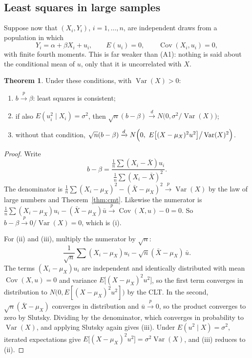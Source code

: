 \documentclass[11pt,a4paper]{article}
\numberwithin{equation}{section}
\DeclareMathOperator{\Var}{Var}
\DeclareMathOperator{\Cov}{Cov}
\theoremstyle{definition}
\newtheorem{thm}{Theorem}[subsection]
\begin{document}
\subsection{Least squares in large samples}
\label{ssec:olsasym}

Suppose now that $(X_i, Y_i)$, $i = 1, \dots, n$, are independent draws from a population in which
\[
Y_i = \alpha + \beta X_i + u_i, \qquad E(u_i) = 0, \qquad \Cov(X_i, u_i) = 0 ,
\]
with finite fourth moments. This is far weaker than (A1): nothing is said about the conditional mean of $u$, only that it is uncorrelated with $X$.

\begin{thm}
\label{thm:olsconsistent}
Under these conditions, with $\Var(X) > 0$:
\begin{enumerate}[label=(\roman*)]
\item $b \xrightarrow{p} \beta$: least squares is consistent;
\item if also $E(u_i^2 \mid X_i) = \sigma^2$, then $\sqrt n(b - \beta) \xrightarrow{d} N\bigl(0, \sigma^2/\Var(X)\bigr)$;
\item without that condition, $\sqrt n(b - \beta) \xrightarrow{d} N\Bigl(0,\ E\bigl[(X - \mu_X)^2u^2\bigr]\big/\Var(X)^2\Bigr)$.
\end{enumerate}
\end{thm}

\begin{proof}
Write
\[
b - \beta = \frac{\frac1n\sum (X_i - \bar X)u_i}{\frac1n\sum (X_i - \bar X)^2} .
\]
The denominator is $\frac1n\sum (X_i - \mu_X)^2 - (\bar X - \mu_X)^2 \xrightarrow{p} \Var(X)$ by the law of large numbers and Theorem~\ref{thm:cmt}. Likewise
the numerator is $\frac1n\sum (X_i - \mu_X)u_i - (\bar X - \mu_X)\bar u \xrightarrow{p} \Cov(X, u) - 0 = 0$. So $b - \beta \xrightarrow{p} 0/\Var(X) = 0$, which is (i).

For (ii) and (iii), multiply the numerator by $\sqrt n$:
\[
\frac{1}{\sqrt n}\sum (X_i - \mu_X)u_i - \sqrt n(\bar X - \mu_X)\,\bar u .
\]
The terms $(X_i - \mu_X)u_i$ are independent and identically distributed with mean $\Cov(X, u) = 0$ and variance $E\bigl[(X - \mu_X)^2u^2\bigr]$, so the first
term converges in distribution to $N\bigl(0, E[(X - \mu_X)^2u^2]\bigr)$ by the CLT. In the second, $\sqrt n(\bar X - \mu_X)$ converges in distribution and
$\bar u \xrightarrow{p} 0$, so the product converges to zero by Slutsky. Dividing by the denominator, which converges in probability to $\Var(X)$, and
applying Slutsky again gives (iii). Under $E(u^2 \mid X) = \sigma^2$, iterated expectations give
$E\bigl[(X - \mu_X)^2u^2\bigr] = \sigma^2\Var(X)$, and (iii) reduces to (ii).
\end{proof}
\end{document}
